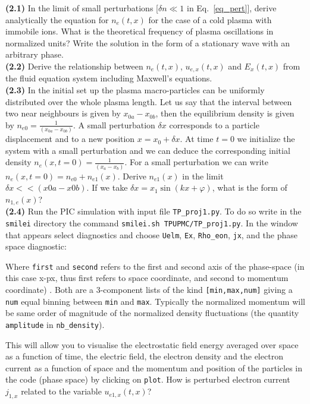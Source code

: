 \documentclass[11pt,a4paper]{article}
\let\oldlstinputlisting
\renewcommand{}[2][]{%
    \oldlstinputlisting[caption={\texttt{\detokenize{#2}}},#1]{#2}%
}
\begin{document}
{\bf (2.1)} In the limit of small perturbations [$\delta n \ll 1$ in Eq.~\eqref{eq_pert}], derive analytically the equation for $n_e(t,x)$ for the case of a cold plasma with immobile ions.   What is the theoretical frequency of plasma oscillations in normalized units? Write the solution in the form of a stationary wave with an arbitrary phase.\\
{\bf (2.2)} Derive the relationship between $n_e(t,x)$, $u_{e,x}(t,x)$ and $E_x(t,x)$ from the fluid equation system including Maxwell's equations.\\
{\bf (2.3)} In the initial set up the plasma macro-particles  can be uniformly distributed over the whole plasma length. Let us say that the interval between two near neighbours is given by  $x_{0a}-x_{0b}$, then   the equilibrium density is given by  $n_{e0} = \frac{1}{(x_{0a}-x_{0b})}$. A small perturbation $\delta x$  corresponds to a particle displacement and to a new position  $x = x_0 +  \delta x$. At time $t=0$ we initialize the system with a small perturbation and we can deduce the corresponding initial density  $n_e(x,t=0)= \frac{1}{(x_{a}-x_{b})}$. For a small perturbation we can write  $n_e(x,t=0)=n_{e0}+n_{e1}(x)$. Derive   $n_{e1}(x)$ in the limit  $\delta x << (x0a-x0b)$. If we take  $\delta x = x_1 \sin(kx +\varphi)$, what is the form of $n_{1,e}(x)$? \\
{\bf (2.4)} Run the PIC simulation with input file \texttt{TP\_proj1.py}. To do so write in the \texttt{smilei} directory the command 
\texttt{smilei.sh TPUPMC/TP\_proj1.py}. In the window that appears select diagnostics and choose \texttt{Uelm}, \texttt{Ex}, \texttt{Rho\_eon}, \texttt{jx}, and the phase space diagnostic:



Where \texttt{first} and \texttt{second} refers to the first and second axis of the phase-space (in this case x-px, thus first refers to space coordinate, and second to momentum coordinate) . Both are a 3-component lists of the kind \texttt{[min,max,num]} giving a \texttt{num} equal binning between \texttt{min} and \texttt{max}. Typically the normalized momentum will be same order of magnitude of the normalized density fluctuations (the quantity  \texttt{amplitude} in \texttt{nb\_density}).

This will allow you to visualise the electrostatic field energy averaged over space as a function of time,  the electric field, the electron density and the electron current as a function of space and the momentum and position of the particles in the code (phase space) by clicking on \texttt{plot}. How is perturbed electron current $j_{1,x}$ related to the variable $u_{e1,x}(t,x)$? 
\end{document}
